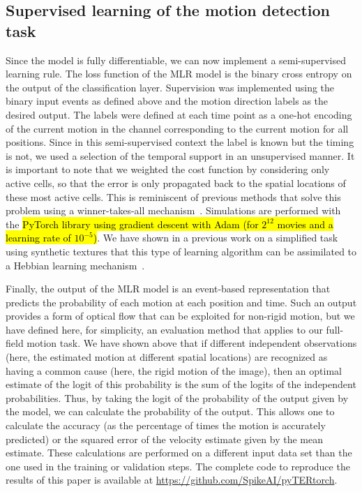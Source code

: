 \documentclass[default]{sn-jnl}%
\theoremstyle{thmstyleone}%
\theoremstyle{thmstyletwo}%
\theoremstyle{thmstylethree}%
\newcommand{\note}[1]{{\sethlcolor{yellow}\hl{#1}}}
\begin{document}
\subsection{Supervised learning of the motion detection task}
%
Since the model is fully differentiable, we can now implement a semi-supervised learning rule. The loss function of the MLR model is the binary cross entropy on the output of the classification layer. Supervision was implemented using the binary input events as defined above and the motion direction labels as the desired output. The labels were defined at each time point as a one-hot encoding of the current motion in the channel corresponding to the current motion for all positions. Since in this semi-supervised context the label is known but the timing is not, we used a selection of the temporal support in an unsupervised manner. It is important to note that we weighted the cost function by considering only active cells, so that the error is only propagated back to the spatial locations of these most active cells. This is reminiscent of previous methods that solve this problem using a winner-takes-all mechanism~\citep{masquelier_unsupervised_2007}. Simulations are performed with the \note{PyTorch library using gradient descent with Adam (for $2^{12}$ movies and a learning rate of $10^{-5}$)}. We have shown in a previous work on a simplified task using synthetic textures that this type of learning algorithm can be assimilated to a Hebbian learning mechanism~\cite{grimaldi_robust_2022}.

Finally, the output of the MLR model is an event-based representation that predicts the probability of each motion at each position and time. Such an output provides a form of optical flow that can be exploited for non-rigid motion, but we have defined here, for simplicity, an evaluation method that applies to our full-field motion task. We have shown above that if different independent observations (here, the estimated motion at different spatial locations) are recognized as having a common cause (here, the rigid motion of the image), then an optimal estimate of the logit of this probability is the sum of the logits of the independent probabilities. Thus, by taking the logit of the probability of the output given by the model, we can calculate the probability of the output. This allows one to calculate the accuracy (as the percentage of times the motion is accurately predicted) or the squared error of the velocity estimate given by the mean estimate. 
These calculations are performed on a different input data set than the one used in the training or validation steps. The complete code to reproduce the results of this paper is available at \url{https://github.com/SpikeAI/pyTERtorch}. %
%
\end{document}
